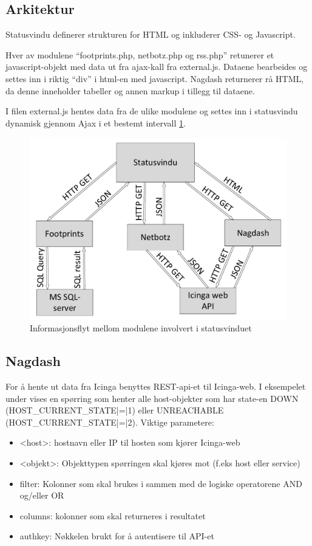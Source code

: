 \subsection{Arkitektur}

Statusvindu definerer strukturen for HTML og inkluderer CSS- og Javascript.

Hver av modulene “footprints.php, netbotz.php og rss.php” retunerer et javascript-objekt med data ut fra ajax-kall fra external.js. Dataene bearbeides og settes inn i riktig “div” i html-en med javascript. Nagdash returnerer rå HTML, da denne inneholder tabeller og annen markup i tillegg til dataene.

I filen external.js hentes data fra de ulike modulene og settes inn i statusvindu dynamisk gjennom Ajax i et bestemt intervall \ref{statusvindu_arkitektur}.

\begin{figure}[H]
    \centering
    \includegraphics[scale=0.4]{img/statusvindu_arkitektur}
    \caption{Informasjonsflyt mellom modulene involvert i statusvinduet}
    \label{statusvindu_arkitektur}
\end{figure}


\subsection{Nagdash}

For å hente ut data fra Icinga benyttes REST-api-et til Icinga-web. I eksempelet under vises en spørring som henter alle host-objekter som har state-en DOWN (HOST\_CURRENT\_STATE|=|1) eller UNREACHABLE (HOST\_CURRENT\_STATE|=|2). Viktige parametere:
\begin{itemize}
	\item <host>: hostnavn eller IP til hosten som kjører Icinga-web
	\item <objekt>: Objekttypen spørringen skal kjøres mot (f.eks host eller service)
	\item filter: Kolonner som skal brukes i sammen med de logiske operatorene AND og/eller OR
	\item columns: kolonner som skal returneres i resultatet
	\item authkey: Nøkkelen brukt for å autentisere til API-et
\end{itemize}

